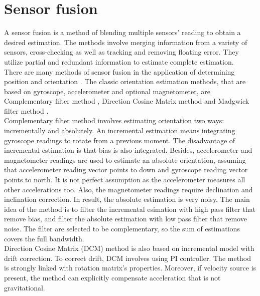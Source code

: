 \chapter{Sensor fusion}

A sensor fusion is a method of blending multiple sensors' reading to obtain a desired estimation. The methods involve merging information from a variety of sensors, cross-checking as well as tracking and removing floating error. They utilize partial and redundant information to estimate complete estimation.\\

There are many methods of sensor fusion in the application of determining position and orientation \cite{uav}. The classic orientation estimation methods, that are based on gyroscope, accelerometer and optional magnetometer, are Complementary filter method \cite{complementary}, Direction Cosine Matrix method \cite{dcm} and Madgwick filter method \cite{madgwick}. \\

Complementary filter method involves estimating orientation two ways: incrementally and absolutely. An incremental estimation means integrating gyroscope readings to rotate from a previous moment. The disadvantage of incremental estimation is that bias is also integrated. Besides, accelerometer and magnetometer readings are used to estimate an absolute orientation, assuming that accelerometer reading vector points to down and gyroscope reading vector points to north. It is not perfect assumption as the accelerometer measures all other accelerations too. Also, the magnetometer readings require declination and inclination correction. In result, the absolute estimation is very noisy. The main idea of the method is to filter the incremental esimation with high pass filter that remove bias, and filter the absolute estimation with low pass filter that remove noise. The filter are selected to be complementary, so the sum of estimations covers the full bandwidth.\\

Direction Cosine Matrix (DCM) method is also based on incremental model with drift correction.
To correct drift, DCM involves using PI controller. The method is strongly linked with rotation matrix's properties. Moreover, if velocity source is present, the method can explicitly compensate acceleration that is not gravitational. \\

